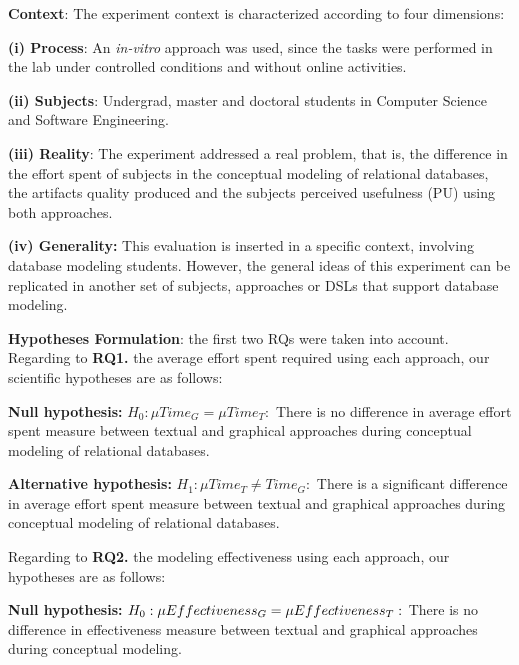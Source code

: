 \documentclass[a4paper,twoside,anonymous]{article}
\begin{document}
\textbf{Context}: The experiment context is characterized according to four dimensions:
\begin{inparadesc}
    \item \textbf{(i) Process}: An \textit{in-vitro} approach was used, since the tasks were performed in the lab under controlled conditions and without online activities.
    \item \textbf{(ii) Subjects}: Undergrad, master and doctoral students in Computer Science and Software Engineering.
    \item \textbf{(iii) Reality}: The experiment addressed a real problem, that is, the difference in the effort spent of subjects in the conceptual modeling of relational databases, the artifacts quality produced and the subjects perceived usefulness (PU) using both approaches.
    \item \textbf{(iv) Generality:} This evaluation is inserted in a specific context, involving database modeling students. 
    However, the general ideas of this experiment can be replicated in another set of subjects, approaches or DSLs that support database modeling.
\end{inparadesc}


\textbf{Hypotheses Formulation}: the first two RQs were taken into account. Regarding to \textbf{RQ1.} the average effort spent required using each approach, our scientific hypotheses are as follows:

\textbf{Null hypothesis:} $H_0 : \mu Time_G = \mu Time_T :$ 
There is no difference in average effort spent measure between textual and graphical approaches during conceptual modeling of relational databases.

\textbf{Alternative hypothesis:} $H_{1} : \mu Time_T \neq Time_G :$ There is a significant difference in average effort spent measure between textual and graphical approaches during conceptual modeling of relational databases.

Regarding to \textbf{RQ2.} the modeling effectiveness using each approach, our hypotheses are as follows:

\textbf{Null hypothesis:} $H_0 : \mu Effectiveness_G = \mu 
\\ Effectiveness_T :$ 
There is no difference in effectiveness measure between textual and graphical approaches during conceptual modeling. %
\end{document}
